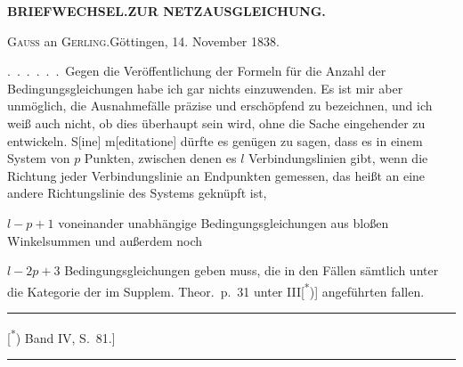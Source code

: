\hfill\textbf{BRIEFWECHSEL.\quad ZUR NETZAUSGLEICHUNG.}
\begin{center}\textsc{Gauss} an \textsc{Gerling}.\quad Göttingen, 14. November 1838.\end{center}

.\ .\ .\ .\ .\ .\ Gegen die Veröffentlichung der Formeln für die Anzahl der
Bedingungsgleichungen habe ich gar nichts einzuwenden. Es ist mir aber
 unmöglich, die Ausnahmefälle präzise und erschöpfend zu
bezeichnen, und ich weiß auch nicht, ob dies überhaupt 
sein wird, ohne die Sache eingehender zu entwickeln. S[ine] m[editatione]
dürfte es genügen zu sagen, dass es in einem System von $p$ Punkten, zwischen
denen es $l$ Verbindungslinien gibt, wenn die Richtung jeder Verbindungslinie
an  Endpunkten gemessen, das heißt an eine andere Richtungslinie
des Systems geknüpft ist,

$l-p+1$ voneinander unabhängige Bedingungsgleichungen aus bloßen Winkelsummen
und außerdem noch

$l-2p+3$  Bedingungsgleichungen geben muss, die in den
 Fällen sämtlich unter die Kategorie der im
Supplem. Theor.\ p.\ 31 unter III[\textsuperscript{*})] angeführten fallen.
\par\medskip
\noindent\rule{.24\textwidth}{.4pt}\par\smallskip
{\footnotesize\noindent\hspace*{1.5em}[\textsuperscript{*}) Band IV, S.\ 81.]\par}
\vspace{2em}
\begin{center}\rule{.18\textwidth}{.4pt}\end{center}
